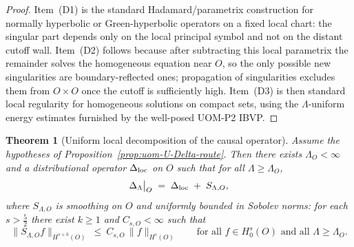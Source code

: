 \documentclass[10pt]{article}
\theoremstyle{definition}
\theoremstyle{plain}
\newtheorem{theorem}{Theorem}[section]
\begin{document}
\begin{proof}
Item~\textnormal{(D1)} is the standard Hadamard/parametrix construction for normally hyperbolic or Green-hyperbolic operators on a fixed local chart: the singular part depends only on the local principal symbol and not on the distant cutoff wall.  Item~\textnormal{(D2)} follows because after subtracting this local parametrix the remainder solves the homogeneous equation near $O$, so the only possible new singularities are boundary-reflected ones; propagation of singularities excludes them from $O\times O$ once the cutoff is sufficiently high.  Item~\textnormal{(D3)} is then standard local regularity for homogeneous solutions on compact sets, using the $\Lambda$-uniform energy estimates furnished by the well-posed UOM-P2 IBVP.
\end{proof}

\begin{theorem}[Uniform local decomposition of the causal operator]
\label{thm:uom-U-Delta}
Assume the hypotheses of Proposition~\ref{prop:uom-U-Delta-route}.  Then there exists $\Lambda_O<\infty$ and a distributional operator
$\Delta_{\rm loc}$ on $O$ such that for all $\Lambda\ge \Lambda_O$,
\begin{equation}
\Delta_\Lambda\big|_{O}
\;=\;
\Delta_{\rm loc}\;+\;S_{\Lambda,O},
\label{eq:Delta-decomp}
\end{equation}
where $S_{\Lambda,O}$ is \emph{smoothing on $O$} and uniformly bounded in Sobolev norms:
for each $s>\frac52$ there exist $k\ge 1$ and $C_{s,O}<\infty$ such that
\begin{equation}
\|S_{\Lambda,O} f\|_{H^{s+k}(O)}\ \le\ C_{s,O}\,\|f\|_{H^{s}(O)}
\qquad\text{for all }f\in H^s_0(O)\text{ and all }\Lambda\ge \Lambda_O.
\label{eq:smoothing-uniform}
\end{equation}
\end{theorem}
\end{document}
